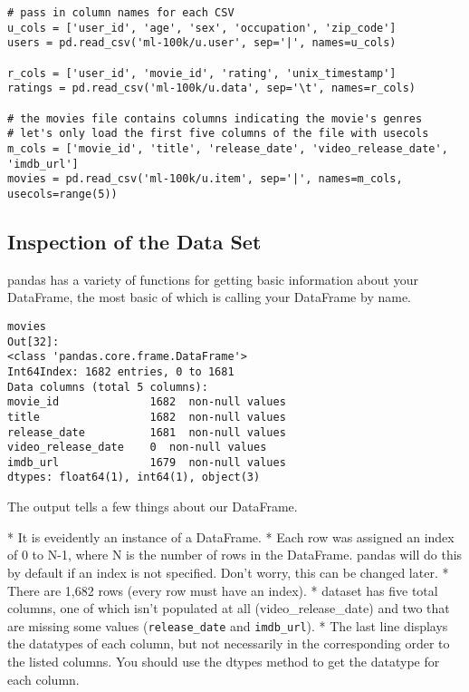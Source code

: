 \begin{framed}
\begin{verbatim}
# pass in column names for each CSV
u_cols = ['user_id', 'age', 'sex', 'occupation', 'zip_code']
users = pd.read_csv('ml-100k/u.user', sep='|', names=u_cols)

r_cols = ['user_id', 'movie_id', 'rating', 'unix_timestamp']
ratings = pd.read_csv('ml-100k/u.data', sep='\t', names=r_cols)

# the movies file contains columns indicating the movie's genres
# let's only load the first five columns of the file with usecols
m_cols = ['movie_id', 'title', 'release_date', 'video_release_date', 'imdb_url']
movies = pd.read_csv('ml-100k/u.item', sep='|', names=m_cols, 
usecols=range(5))
\end{verbatim}

\subsection{Inspection of the Data Set}

pandas has a variety of functions for getting basic information about your DataFrame, the most basic of which is calling your DataFrame by name.
\begin{verbatim}
movies
Out[32]:
<class 'pandas.core.frame.DataFrame'>
Int64Index: 1682 entries, 0 to 1681
Data columns (total 5 columns):
movie_id              1682  non-null values
title                 1682  non-null values
release_date          1681  non-null values
video_release_date    0  non-null values
imdb_url              1679  non-null values
dtypes: float64(1), int64(1), object(3)
\end{verbatim}
The output tells a few things about our DataFrame.


*  It is eveidently an instance of a DataFrame.
*  Each row was assigned an index of 0 to N-1, where N is the number of rows in the DataFrame. pandas will do this by default if an index is not specified. Don't worry, this can be changed later.
*  There are 1,682 rows (every row must have an index).
*   dataset has five total columns, one of which isn't populated at all (video\_release\_date) and two that are missing some values (\texttt{release\_date} and \texttt{imdb\_url}).
*  The last line displays the datatypes of each column, but not necessarily in the corresponding order to the listed columns. You should use the dtypes method to get the datatype for each column.



\end{framed}
